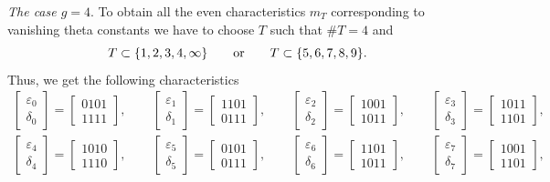 \documentclass[pdftex]{sigma}
\numberwithin{equation}{section}
\newcommand{\de}{\delta}
\newcommand{\ep}{\varepsilon}
\begin{document}
{\it The case $g=4$}. To obtain all the even characteristics $m_T$ corresponding to vanishing theta constants we have to choose $T$ such that $\#T=4$ and
\[
T\subset\{ 1, 2, 3, 4, \infty \} \qquad {\rm or}\qquad
 T\subset\{ 5, 6, 7, 8, 9 \}.
\]
Thus, we get the following characteristics
\begin{gather}
\left[\begin{matrix}\ep_0\\ \de_0\end{matrix}\right]=\begin{bmatrix} 0 1 0 1 \\ 1 1 1 1 \end{bmatrix},\qquad \left[\begin{matrix}\ep_1\\ \de_1\end{matrix}\right]=\begin{bmatrix}1 1 0 1 \\ 0 1 1 1 \end{bmatrix}, \qquad \left[\begin{matrix}\ep_2 \\ \de_2 \end{matrix}\right]=\begin{bmatrix}1 0 0 1 \\ 1 0 1 1 \end{bmatrix}, \qquad \left[\begin{matrix}\ep_3 \\ \de_3 \end{matrix}\right]=\begin{bmatrix}1 0 1 1 \\ 1 1 0 1 \end{bmatrix}, \nonumber\\
 \left[\begin{matrix}\ep_4 \\ \de_4 \end{matrix}\right]=\begin{bmatrix} 1 0 1 0 \\ 1 1 1 0 \end{bmatrix},\qquad
\left[\begin{matrix}\ep_5 \\ \de_5 \end{matrix}\right]=\begin{bmatrix} 0 1 0 1 \\ 0 1 1 1 \end{bmatrix},\qquad \left[\begin{matrix}\ep_6 \\ \de_6 \end{matrix}\right]=\begin{bmatrix} 1 1 0 1 \\ 1 0 1 1 \end{bmatrix},\qquad \left[\begin{matrix}\ep_7 \\ \de_7 \end{matrix}\right]=\begin{bmatrix} 1 0 0 1 \\ 1 1 0 1 \end{bmatrix}, \nonumber\\

\end{gather}
\end{document}
